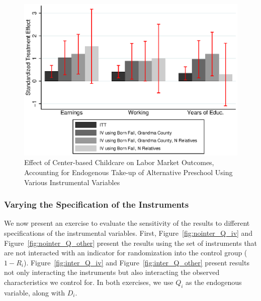 \begin{appendices}
\begin{figure}[H]
		\caption{Effect of Center-based Childcare on Labor Market Outcomes, Accounting for Endogenous Take-up of Alternative Preschool Using Various Instrumental Variables} \label{fig:ins_inter_Q_iv2}
		\includegraphics[width=.7\columnwidth]{output/appendixplots/ins_inter_Q_iv_other.eps}
\end{figure}

\subsubsection{Varying the Specification of the Instruments}

\noindent We now present an exercise to evaluate the sensitivity of the results to different specifications of the instrumental variables. First, Figure~\ref{fig:nointer_Q_iv} and Figure~\ref{fig:nointer_Q_other} present the results using the set of instruments that are not interacted with an indicator for randomization into the control group ($1-R_i$). Figure~\ref{fig:inter_Q_iv} and Figure~\ref{fig:inter_Q_other} present results not only interacting the instruments but also interacting the observed characteristics we control for. In both exercises, we use $Q_i$ as the endogenous variable, along with $D_i$.\\


\end{appendices}
